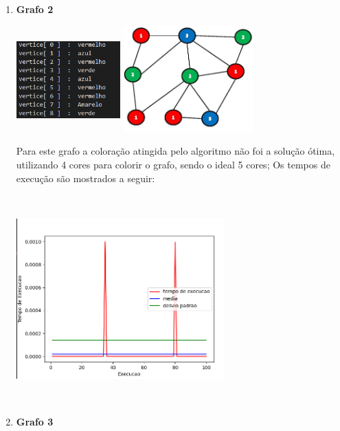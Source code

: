 \documentclass[12pt,openright,oneside,a4paper,brazil]{abntex2}
\begin{document}
\begin{enumerate}
\begin{center}
		\end{center}
	\item \textbf{Grafo 2}
	
	    \includegraphics[width=4cm,height=4cm]{Coloracao-grafo2.png}
	    \includegraphics[width=5cm]{grafo2.png}
	    
	    Para este grafo a coloração atingida pelo algoritmo não foi a solução ótima, utilizando 4 cores para colorir o grafo, sendo o ideal 5 cores;
	   Os tempos de execução são mostrados a seguir:
	    
	    \begin{center}
	    	\includegraphics[width=8cm,height=8cm]{grafico-grafo2.png}
	    	
	    \end{center}
	    
	\item \textbf{Grafo 3}
		

\end{enumerate}
\end{document}
